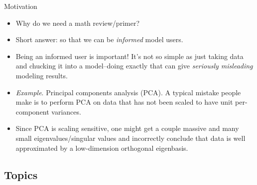 \documentclass{beamer}
\numberwithin{equation}{section}
\begin{document}
\begin{frame}{Motivation}
    \begin{itemize}
        \item
        Why do we need a math review/primer?
        
        \item
        Short answer: so that we can be \textit{informed} model users.
        
        \item
        Being an informed user is important! It's not so simple as just taking
        data and chucking it into a model--doing exactly that can give
        \textit{seriously misleading} modeling results.

        \item
        \textit{Example}. Principal components analysis (PCA). A typical
        mistake people make\footnotemark{} is to perform PCA on data that has not been scaled to have unit
        per-component variances.

        \item
        Since PCA is scaling sensitive, one might get a couple massive
        and many small eigenvalues/singular values\footnotemark{} and incorrectly conclude that data is well approximated by a
        low-dimension orthogonal eigenbasis.

        \medskip
    \end{itemize}
\end{frame}

\subsection{Topics}
\end{document}
